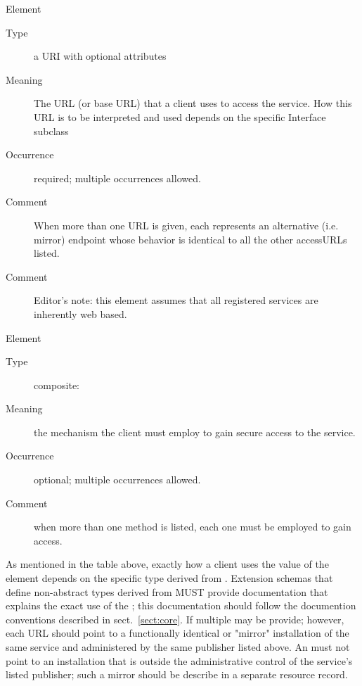 \documentclass[11pt,a4paper]{ivoa}
\begin{document}
\begingroup\small\begin{bigdescription}\item[Element \xmlel{accessURL}]
\begin{description}
\item[Type] a URI with optional attributes
\item[Meaning] 
                 The URL (or base URL) that a client uses to access the
                 service.  How this URL is to be interpreted and used 
                 depends on the specific Interface subclass
               
\item[Occurrence] required; multiple occurrences allowed.
\item[Comment] 
                 When more than one URL is given, each represents an
                 alternative (i.e. mirror) endpoint whose behavior is
                 identical to all the other accessURLs listed.  
               
\item[Comment] 
                 Editor's note: this element assumes that
                 all registered services are inherently web based.
               

\end{description}
\item[Element \xmlel{securityMethod}]
\begin{description}
\item[Type] composite: 
\item[Meaning] 
                  the mechanism the client must employ to gain secure
                  access to the service.  
               
\item[Occurrence] optional; multiple occurrences allowed.
\item[Comment] 
                  when more than one method is listed, each one must
                  be employed to gain access.  
               

\end{description}


\end{bigdescription}\endgroup

\endgroup


As mentioned in the table above, exactly how a client uses the value
of the  element depends on the specific
type derived from .  Extension schemas that
define non-abstract types derived from  MUST
provide documentation that explains the exact use of the
; this documentation should follow the
documention conventions described in sect.~\ref{sect:core}.  If multiple
 may be provide; however, each URL should
point to a functionally identical or "mirror" installation of the same
service and administered by the same publisher listed above.  An
 must not point to an installation
that is outside the administrative control of the service's listed
publisher; such a mirror should be describe in a separate resource
record.  
\end{document}
